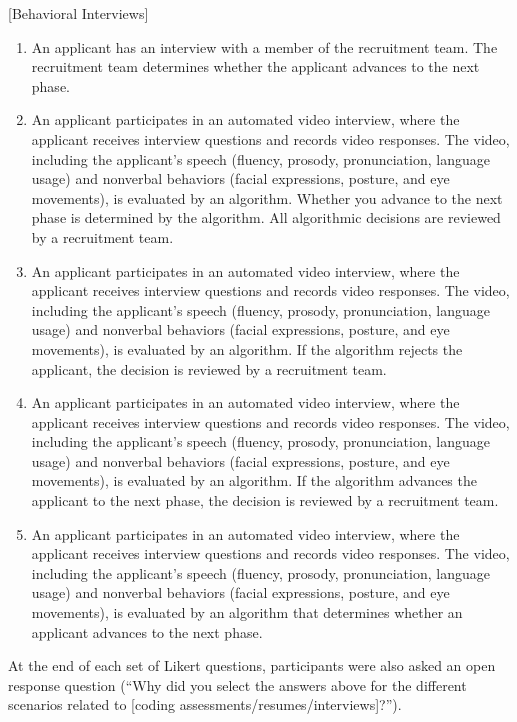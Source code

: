 [Behavioral Interviews]
\begin{enumerate}
\item An applicant has an interview with a member of the recruitment team. The recruitment team determines whether the applicant advances to the next phase.
\item An applicant participates in an automated video interview, where the applicant receives interview questions and records video responses. The video, including the applicant’s speech (fluency, prosody, pronunciation, language usage) and nonverbal behaviors (facial expressions, posture, and eye movements), is evaluated by an algorithm. Whether you advance to the next phase is determined by the algorithm. All algorithmic decisions are reviewed by a recruitment team.
\item An applicant participates in an automated video interview, where the applicant receives interview questions and records video responses. The video, including the applicant’s speech (fluency, prosody, pronunciation, language usage) and nonverbal behaviors (facial expressions, posture, and eye movements), is evaluated by an algorithm. If the algorithm rejects the applicant,  the decision is reviewed by a recruitment team. 
\item An applicant participates in an automated video interview, where the applicant receives interview questions and records video responses. The video, including the applicant’s speech (fluency, prosody, pronunciation, language usage) and nonverbal behaviors (facial expressions, posture, and eye movements), is evaluated by an algorithm. If the algorithm advances the applicant to the next phase, the decision is reviewed by a recruitment team. 
\item An applicant participates in an automated video interview, where the applicant receives interview questions and records video responses. The video, including the applicant’s speech (fluency, prosody, pronunciation, language usage) and nonverbal behaviors (facial expressions, posture, and eye movements), is evaluated by an algorithm that determines whether an applicant advances to the next phase.
\end{enumerate}

At the end of each set of Likert questions, participants were also asked an open response question (``Why did you select the answers above for the different scenarios related to [coding assessments/resumes/interviews]?'').

